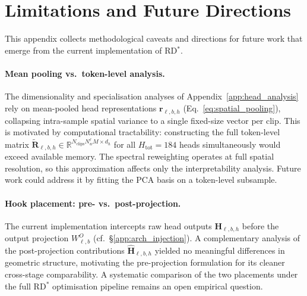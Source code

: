 
\section{Limitations and Future Directions}
\label{app:limitations}

This appendix collects methodological caveats and directions for future 
work that emerge from the current implementation of RD$^*$\xspace.

\paragraph{Mean pooling vs.\ token-level analysis.}

The dimensionality and specialisation analyses of 
Appendix~\ref{app:head_analysis} rely on mean-pooled head representations 
$\mathbf{r}_{\ell,b,h}$ (Eq.~\eqref{eq:spatial_pooling}), collapsing 
intra-sample spatial variance to a single fixed-size vector per clip. 
This is motivated by computational tractability: constructing the full 
token-level matrix $\widetilde{\mathbf{R}}_{\ell,b,h} \in 
\mathbb{R}^{N_\text{clips} N_w^\ell M \times d_h}$ for all $H_{\mathrm{tot}} = 184$ 
heads simultaneously would exceed available memory. 
The spectral reweighting operates at full spatial resolution, so this 
approximation affects only the interpretability analysis. 
Future work could address it by fitting the PCA basis on a token-level 
subsample.

\paragraph{Hook placement: pre- vs.\ post-projection.}

The current implementation intercepts raw head outputs 
$\mathbf{H}_{\ell,b,h}$ before the output projection $W^O_{\ell,b}$ 
(cf.\ \S\ref{app:arch_injection}). A complementary analysis of the 
post-projection contributions $\widehat{\mathbf{H}}_{\ell,b,h}$ yielded 
no meaningful differences in geometric structure, motivating the 
pre-projection formulation for its cleaner cross-stage comparability. 
A systematic comparison of the two placements under the full RD$^*$\xspace 
optimisation pipeline remains an open empirical question.

